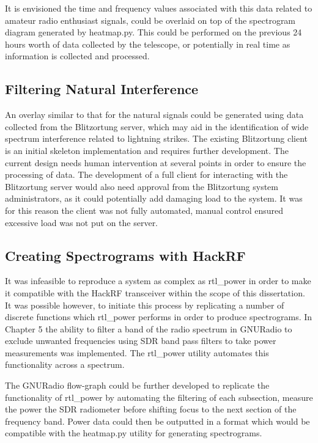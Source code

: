 It is envisioned the time and frequency values associated with this data related to amateur radio enthusiast signals, could be overlaid on top of the spectrogram diagram generated by heatmap.py. This could be performed on the previous 24 hours worth of data collected by the telescope, or potentially in real time as information is collected and processed.

\subsection*{Filtering Natural Interference}

An overlay similar to that for the natural signals could be generated using data collected from the Blitzortung server, which may aid in the identification of wide spectrum interference related to lightning strikes. The existing Blitzortung client is an initial skeleton implementation and requires further development. The current design needs human intervention at several points in order to ensure the processing of data. The development of a full client for interacting with the Blitzortung server would also need approval from the Blitzortung system administrators, as it could potentially add damaging load to the system. It was for this reason the client was not fully automated, manual control ensured excessive load was not put on the server.

\subsection*{Creating Spectrograms with HackRF}

It was infeasible to reproduce a system as complex as rtl\_power in order to make it compatible with the HackRF transceiver within the scope of this dissertation. It was possible however, to initiate this process by replicating a number of discrete functions which rtl\_power performs in order to produce spectrograms. In Chapter 5 the ability to filter a band of the radio spectrum in GNURadio to exclude unwanted frequencies using \gls{SDR} band pass filters to take power measurements was implemented. The rtl\_power utility automates this functionality across a spectrum. 

The GNURadio flow-graph could be further developed to replicate the functionality of rtl\_power by automating the filtering of each subsection, measure the power the \gls{SDR} radiometer before shifting focus to the next section of the frequency band. Power data could then be outputted in a format which would be compatible with the heatmap.py utility for generating spectrograms.


